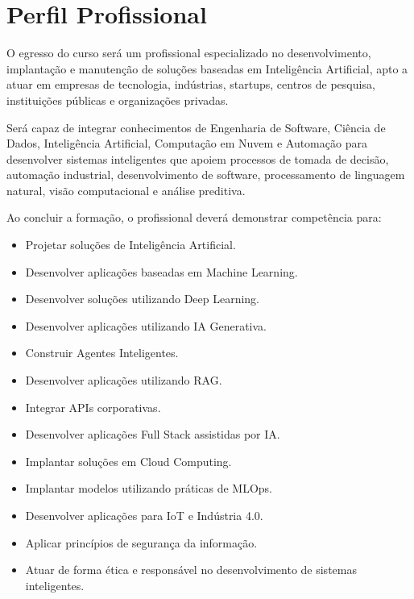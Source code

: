 \chapter{Perfil Profissional}

O egresso do curso será um profissional especializado no desenvolvimento, implantação e manutenção de soluções baseadas em Inteligência Artificial, apto a atuar em empresas de tecnologia, indústrias, startups, centros de pesquisa, instituições públicas e organizações privadas.

Será capaz de integrar conhecimentos de Engenharia de Software, Ciência de Dados, Inteligência Artificial, Computação em Nuvem e Automação para desenvolver sistemas inteligentes que apoiem processos de tomada de decisão, automação industrial, desenvolvimento de software, processamento de linguagem natural, visão computacional e análise preditiva.

Ao concluir a formação, o profissional deverá demonstrar competência para:

\begin{itemize}
\item Projetar soluções de Inteligência Artificial.
\item Desenvolver aplicações baseadas em Machine Learning.
\item Desenvolver soluções utilizando Deep Learning.
\item Desenvolver aplicações utilizando IA Generativa.
\item Construir Agentes Inteligentes.
\item Desenvolver aplicações utilizando RAG.
\item Integrar APIs corporativas.
\item Desenvolver aplicações Full Stack assistidas por IA.
\item Implantar soluções em Cloud Computing.
\item Implantar modelos utilizando práticas de MLOps.
\item Desenvolver aplicações para IoT e Indústria 4.0.
\item Aplicar princípios de segurança da informação.
\item Atuar de forma ética e responsável no desenvolvimento de sistemas inteligentes.
\end{itemize}
